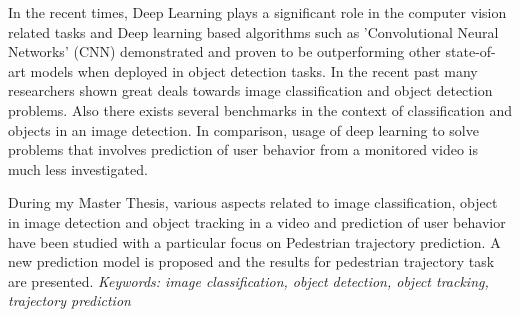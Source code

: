 % 
% 
%
In the recent times, Deep Learning plays a significant role in the computer vision
related tasks and Deep learning based algorithms such as 'Convolutional Neural Networks'
(CNN) demonstrated and proven to be outperforming other state-of-art models when 
deployed in object detection tasks. In the recent past many researchers shown great 
deals towards image classification and object detection problems. Also there exists several 
benchmarks in the context of classification and objects in an image detection. In 
comparison, usage of deep learning to solve problems that involves prediction of 
user behavior from a monitored video is much less investigated.

\vspace{1em}
\noindent During my Master Thesis, various aspects related to image classification, object 
in image detection and object tracking in a video and prediction of user behavior 
have been studied with a particular focus on Pedestrian trajectory prediction. 
A new prediction model is proposed and the results for pedestrian trajectory 
task are presented.
\baselineskip
\textit{Keywords: image classification, object detection, object tracking, trajectory prediction}
